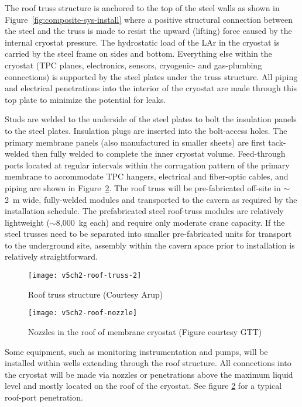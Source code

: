 The roof truss structure is anchored to the top of the steel walls 
as shown in Figure~\ref{fig:composite-sys-install} 
where a positive structural connection between the steel and the 
truss is made to resist the upward (lifting) force caused by the 
internal cryostat pressure. The hydrostatic load of the LAr in the 
cryostat is carried by the steel frame on sides and bottom. Everything 
else within the cryostat (TPC planes, electronics, sensors,
cryogenic- and gas-plumbing connections) is supported by the 
steel plates under the truss structure. All piping and electrical 
penetrations into the interior of the cryostat are made through 
this top plate to minimize the potential for leaks.

Studs are welded to the underside of the steel plates to bolt the 
insulation panels to the steel plates. Insulation plugs are inserted 
into the bolt-access holes.  The primary membrane panels (also 
manufactured in smaller sheets) are first tack-welded then fully 
welded to complete the inner cryostat volume. Feed-through 
ports located at regular intervals within the corrugation pattern
of the primary membrane to accommodate TPC hangers, electrical 
and fiber-optic cables, and piping are
shown in Figure~\ref{fig:v5ch2-roof-nozzle}. 
The roof truss will be pre-fabricated 
off-site in $\sim$2~m wide, fully-welded modules and transported to
the cavern as required by the installation schedule.
The prefabricated steel roof-truss modules are relatively 
lightweight ($\sim$8,000~kg each) and require only moderate 
crane capacity.  If the steel trusses need to be separated 
into smaller pre-fabricated units for transport to the 
underground site, assembly within the cavern space prior to 
installation is relatively straightforward. 

\begin{figure}[htbp]
\centering
\texttt{[image: v5ch2-roof-truss-2]}
\caption[Roof truss structure]{Roof truss structure  (Courtesy Arup)}
\label{fig:roof-truss}
\end{figure}


\begin{figure}[htbp]
\centering
\texttt{[image: v5ch2-roof-nozzle]} 
\caption[Nozzles in the roof of membrane cryostat]{Nozzles in the roof of membrane cryostat (Figure courtesy GTT)}
\label{fig:v5ch2-roof-nozzle}
\end{figure}

Some equipment, such as monitoring instrumentation and pumps, 
will be installed within wells extending through the roof 
structure. All connections into the cryostat will be made 
via nozzles or penetrations above the maximum liquid level 
and mostly located on the roof of the cryostat. See figure 
\ref{fig:v5ch2-roof-nozzle} for a typical roof-port 
penetration.  

